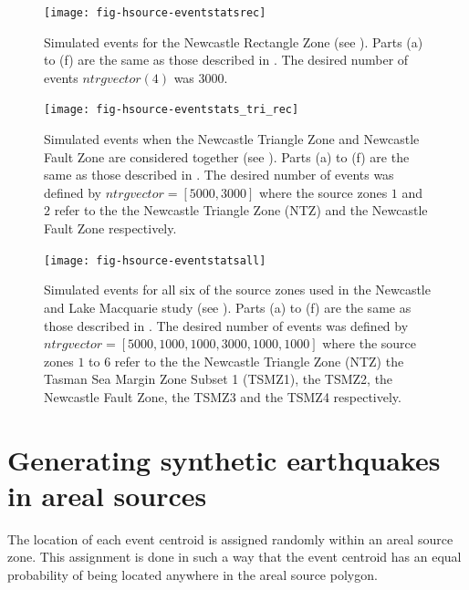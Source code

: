 \begin{figure}
\begin{center}
\texttt{[image: fig-hsource-eventstatsrec]}
\end{center}
\caption{Simulated events for the Newcastle Rectangle Zone (see
\citealt{dr_Dhu02b}). Parts (a) to (f) are the same as those
described in . The desired
number of events $ntrgvector(4)$ was $3000$.}
\label{fig:source-catalogue-results2}
\end{figure}

\begin{figure}
\begin{center}
\texttt{[image: fig-hsource-eventstats\_tri\_rec]}
\end{center}
 \caption{Simulated
events when the Newcastle Triangle Zone and Newcastle Fault Zone
are considered together (see \citealt{dr_Dhu02b}). Parts (a) to
(f) are the same as those described in
. The desired number of events
was defined by $ntrgvector = [5000,3000]$ where the source zones
$1$ and $2$ refer to the the Newcastle Triangle Zone (NTZ) and the
Newcastle Fault Zone respectively.}
\label{fig:source-catalogue-results3}
\end{figure}



\begin{figure}
\begin{center}
\texttt{[image: fig-hsource-eventstatsall]}
\end{center}
\caption{Simulated events for all six of the source zones used in
the Newcastle and Lake Macquarie study (see \citealt{dr_Dhu02b}).
Parts (a) to (f) are the same as those described in
. The desired number of events
was defined by $ntrgvector = [5000,1000,1000,3000,1000,1000]$
where the source zones $1$ to $6$ refer to the the Newcastle
Triangle Zone (NTZ) the Tasman Sea Margin Zone Subset 1 (TSMZ1),
the TSMZ2, the Newcastle Fault Zone, the TSMZ3 and the TSMZ4
respectively.} \label{fig:source-catalogue-results4}
\end{figure}



\section{Generating synthetic earthquakes in areal sources}
\label{sec:areal_gen}

The location of each event centroid is assigned randomly within an areal source zone. 
This assignment is done in such a way that the event centroid has
an equal probability of being located anywhere in the areal source
polygon. 


